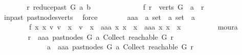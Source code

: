 \begin{isabellebody}
\ \ \ \ \isamarkupfalse%
\ \isamarkupfalse%
\ {\isachardoublequoteopen}r\ {\isasymrightarrow}\isactrlsup {\isacharasterisk}{\kern0pt}\isactrlbsub reduce{\isacharunderscore}{\kern0pt}past\ G\ a\isactrlesub \ b{\isachardoublequoteclose}\isanewline
\ \ \ \ \isamarkupfalse%
\ {\isacharminus}{\kern0pt}\isanewline
\ \ \ \ \ \ \isamarkupfalse%
\ f{}{\isacharcolon}{\kern0pt}\ {\isachardoublequoteopen}r\ {\isasymin}\ verts\ G\ {\isasymand}\ a\ {\isasymrightarrow}\isactrlsup {\isacharplus}{\kern0pt}\ r{\isachardoublequoteclose}\isanewline
\ \ \ \ \ \ \ \ \isamarkupfalse%
\ in{\isacharunderscore}{\kern0pt}past\ past{\isacharunderscore}{\kern0pt}nodes{\isacharunderscore}{\kern0pt}verts\ \isamarkupfalse%
\ force\isanewline
\ \ \ \ \ \ \isamarkupfalse%
\ aaa\ {\isacharcolon}{\kern0pt}{\isacharcolon}{\kern0pt}\ {\isachardoublequoteopen}{\isacharprime}{\kern0pt}a\ set\ {\isasymRightarrow}\ {\isacharprime}{\kern0pt}a\ set\ {\isasymRightarrow}\ {\isacharprime}{\kern0pt}a{\isachardoublequoteclose}\ \isanewline
\ \ \ \ \ \ \ \ f{}{\isacharcolon}{\kern0pt}\ {\isachardoublequoteopen}{\isasymforall}x{}\ x{}{\isachardot}{\kern0pt}\ {\isacharparenleft}{\kern0pt}{\isasymexists}v{}{\isachardot}{\kern0pt}\ v{}\ {\isasymin}\ x{}\ {\isasymand}\ v{}\ {\isasymnotin}\ x{}{\isacharparenright}{\kern0pt}\ {\isacharequal}{\kern0pt}\ {\isacharparenleft}{\kern0pt}aaa\ x{}\ x{}\ {\isasymin}\ x{}\ {\isasymand}\ aaa\ x{}\ x{}\ {\isasymnotin}\ x{}{\isacharparenright}{\kern0pt}{\isachardoublequoteclose}\isanewline
\ \ \ \ \ \ \ \ \isamarkupfalse%
\ moura\isanewline
\ \ \ \ \ \ \isamarkupfalse%
\ {\isachardoublequoteopen}r\ {\isasymrightarrow}\isactrlsup {\isacharasterisk}{\kern0pt}\ aaa\ {\isacharparenleft}{\kern0pt}past{\isacharunderscore}{\kern0pt}nodes\ G\ a{\isacharparenright}{\kern0pt}\ {\isacharparenleft}{\kern0pt}Collect\ {\isacharparenleft}{\kern0pt}reachable\ G\ r{\isacharparenright}{\kern0pt}{\isacharparenright}{\kern0pt}\isanewline
\ \ \ \ \ \ \ \ \ \ \ \ {\isasymlongrightarrow}\ a\ {\isasymrightarrow}\isactrlsup {\isacharplus}{\kern0pt}\ aaa\ {\isacharparenleft}{\kern0pt}past{\isacharunderscore}{\kern0pt}nodes\ G\ a{\isacharparenright}{\kern0pt}\ {\isacharparenleft}{\kern0pt}Collect\ {\isacharparenleft}{\kern0pt}reachable\ G\ r{\isacharparenright}{\kern0pt}{\isacharparenright}{\kern0pt}{\isachardoublequoteclose}\isanewline

\end{isabellebody}

